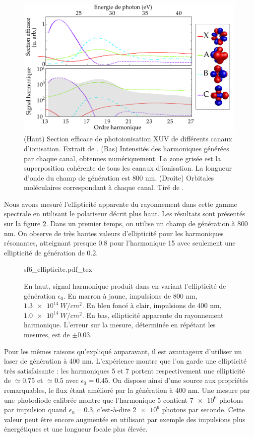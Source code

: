 \begin{figure}[!ht]
\centering
\includegraphics[width=.8\columnwidth]{Figures/SF6/sf6_cross_section.png}%
\caption{(Haut) Section efficace de photoionisation XUV de différents canaux d'ionisation. Extrait de . (Bas) Intensités des harmoniques générées par chaque canal, obtenues numériquement. La zone grisée est la superposition cohérente de tous les canaux d'ionisation. La longueur d'onde du champ de génération est 800 nm. (Droite) Orbitales moléculaires correspondant à chaque canal. Tiré de .}
\label{fig:sf6_cross_section}
\end{figure}

Nous avons mesuré l'ellipticité apparente du rayonnement dans cette gamme spectrale en utilisant le polariseur décrit plus haut. Les résultats sont présentés sur la figure \ref{fig:sf6_ell}. Dans un premier temps, on utilise un champ de génération à 800 nm. On observe de très hautes valeurs d'ellipticité pour les harmoniques résonantes, atteignant presque 0.8 pour l'harmonique 15 avec seulement une ellipticité de génération de 0.2. 

\begin{figure}[!ht]
\centering
\def\svgwidth{1\columnwidth}
{sf6_ellipticite.pdf_tex}
\caption{En haut, signal harmonique produit dans  en variant l'ellipticité de génération $\epsilon_0$. En marron à jaune, impulsions de 800 nm, $\SI{1.3e14}{W/cm^2}$. En bleu foncé à clair, impulsions de 400 nm, $\SI{1.0e14}{W/cm^2}$. En bas, ellipticité apparente du rayonnement harmonique. L'erreur sur la mesure, déterminée en répétant les mesures, est de $\pm0.03$.}
\label{fig:sf6_ell}
\end{figure}

Pour les mêmes raisons qu'expliqué auparavant, il est avantageux d'utiliser un laser de génération à 400 nm. L'expérience montre que l'on garde une ellipticité très satisfaisante : les harmoniques 5 et 7 portent respectivement une ellipticité de $\simeq 0.75$ et $\simeq 0.5$ avec $\epsilon_0=0.45$. On dispose ainsi d'une source aux propriétés remarquables, le flux étant amélioré par la génération à 400 nm. Une mesure par une photodiode calibrée montre que l'harmonique 5 contient $\num{7e6}$ photons par impulsion quand $\epsilon_0=0.3$, c'est-à-dire $\num{2e9}$ photons par seconde. Cette valeur peut être encore augmentée en utilisant par exemple des impulsions plus énergétiques et une longueur focale plus élevée.

